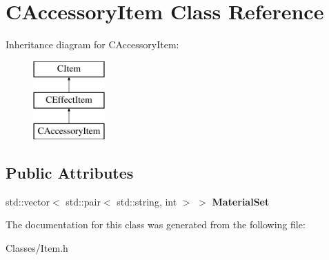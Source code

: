 \hypertarget{class_c_accessory_item}{}\section{C\+Accessory\+Item Class Reference}
\label{class_c_accessory_item}
Inheritance diagram for C\+Accessory\+Item\+:\begin{figure}[H]
\begin{center}
\leavevmode
\includegraphics[height=3.000000cm]{class_c_accessory_item}
\end{center}
\end{figure}
\subsection*{Public Attributes}
\begin{DoxyCompactItemize}
\item 
std\+::vector$<$ std\+::pair$<$ std\+::string, int $>$ $>$ {\bfseries Material\+Set}\hypertarget{class_c_accessory_item_adc580086ec44d7bcc2b19512c79f19fe}{}\label{class_c_accessory_item_adc580086ec44d7bcc2b19512c79f19fe}

\end{DoxyCompactItemize}


The documentation for this class was generated from the following file\+:\begin{DoxyCompactItemize}
\item 
Classes/Item.\+h\end{DoxyCompactItemize}
